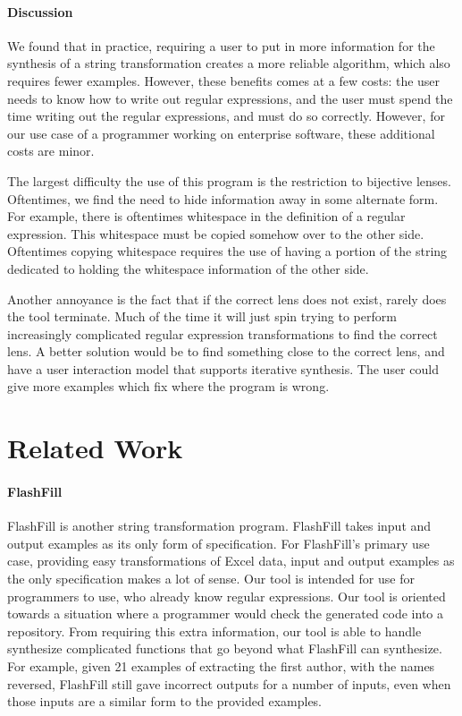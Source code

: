 \documentclass[numbers,10pt,preprint\ifanon ,nocopyrightspace\fi]{sigplanconf}
\begin{document}
\paragraph*{Discussion}

We found that in practice, requiring a user to put in more information for the
synthesis of a string transformation creates a more reliable algorithm, which
also requires fewer examples.
However, these benefits comes at a few costs: the user needs to know how to write out
regular expressions, and the user must spend the time writing out the regular
expressions, and must do so correctly.  However, for our use case of a
programmer working on enterprise software, these additional costs are minor.

The largest difficulty the use of this program is the restriction to bijective lenses.
Oftentimes, we find the need to hide information away in some alternate form.
For example, there is oftentimes whitespace in the definition of a regular
expression.  This whitespace must be copied somehow over to the other side.
Oftentimes copying whitespace requires the use of having a portion of the string dedicated to
holding the whitespace information of the other side.

Another annoyance is the fact that if the correct lens does not exist,
rarely does the tool terminate.  Much of the time it will just spin trying to
perform increasingly complicated regular expression transformations to find the
correct lens.
A better solution would be to find something close to the correct lens, and have
a user interaction model that supports iterative synthesis.  The user could give
more examples which fix where the program is wrong.


\section{Related Work}
\paragraph*{FlashFill}
FlashFill is another string transformation program.  FlashFill takes input and
output examples as its only form of specification.  For FlashFill's primary use
case, providing easy transformations of Excel data, input and output examples as
the only specification makes a lot of sense.  Our tool is intended for use for
programmers to use, who already know regular expressions.  Our tool is oriented
towards a situation where a programmer would check the generated code into a
repository.  From requiring this extra information, our tool is able to handle
synthesize complicated functions that go beyond what FlashFill can synthesize.
For example, given 21 examples of extracting the first author, with the names
reversed, FlashFill still gave incorrect outputs for a number of inputs, even
when those inputs are a similar form to the provided examples.
\end{document}
